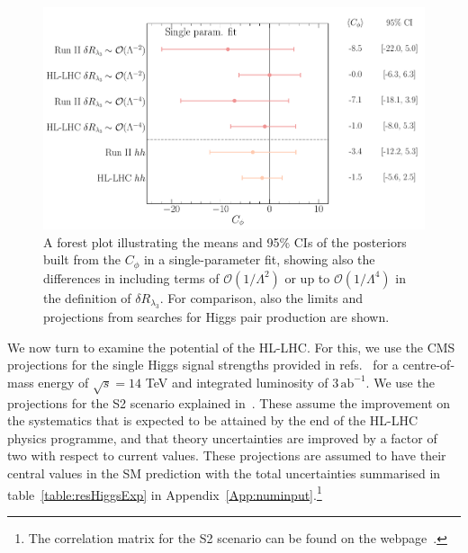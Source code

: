 \begin{figure}
	\begin{center}
		\includegraphics[width=0.75\linewidth]{fig/uebeblick_forest_cphi_singleparam}
	\end{center}
	\caption{A forest plot illustrating the means and 95\% CIs of the posteriors built from the  $C_\phi$  in a single-parameter fit, showing also the differences in including terms of $\mathcal{O}(1/\Lambda^2)$ or up to $\mathcal{O}(1/\Lambda^4)$ in the definition of $\delta R_{\lambda_3}$. For comparison, also the limits and projections from searches for Higgs pair production are shown.  \label{fig:summcphihl-lhc}  }
\end{figure}
We now turn to examine the potential of the HL-LHC. For this, we use the CMS projections for the single Higgs signal strengths provided in refs.~\cite{CMS-PAS-FTR-18-011,twiki} for a centre-of-mass energy of $\sqrt{s}=14$ TeV and integrated luminosity of $ 3\, \mathrm{ab}^{-1}$. We use the projections for the S2 scenario explained in~\cite{Cepeda:2019klc}. These assume the improvement on the systematics that is expected to be attained by the end of the HL-LHC physics programme, and that theory uncertainties are improved by a factor of two with respect to current values. 
These projections are assumed to have their central values in the SM prediction with the total uncertainties summarised in table~\ref{table:resHiggsExp} in Appendix~\ref{App:numinput}.\footnote{The correlation matrix for the S2 scenario can be found on the webpage~\cite{twiki}.} 

